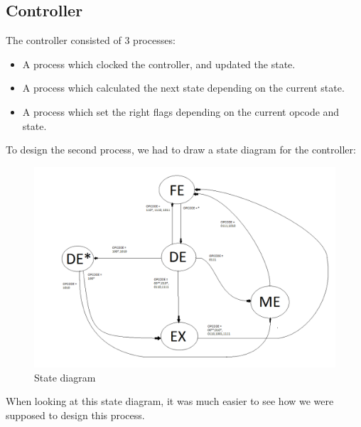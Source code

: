 \documentclass[a4paper]{article}
\begin{document}
\subsection{Controller}
The controller consisted of 3 processes:
\begin{itemize}
 \item A process which clocked the controller, and updated the state.
 \item A process which calculated the next state depending on the current state.
 \item A process which set the right flags depending on the current opcode and state.
\end{itemize}

To design the second process, we had to draw a state diagram for the controller:\\



\begin{figure}[H]
\centering
\includegraphics[scale=0.3]{FSM}
\caption{State diagram}
\end{figure}


When looking at this state diagram, it was much easier to see how we were supposed to design this process.
\end{document}
